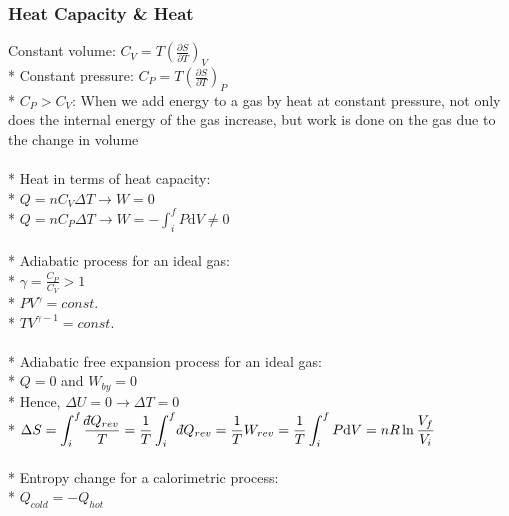 \subsubsection{Heat Capacity \& Heat}
Constant volume: \(\displaystyle C_V=T\left(\frac{\partial S}{\partial T}\right)_V\)\\*
Constant pressure: \(\displaystyle C_P=T\left(\frac{\partial S}{\partial T}\right)_P\)\\*
\(C_P>C_V\): When we add energy to a gas by heat at constant pressure, not only does the internal energy of the gas increase, but work is done on the gas due to the change in volume\\\\*
%
Heat in terms of heat capacity:\\*
\(Q=nC_V\Delta T \rightarrow W=0\)\\*
\(Q=nC_P\Delta T \rightarrow W=-\int_i^f{P\mathrm{d}V}\neq0\)\\\\*
%
Adiabatic process for an ideal gas:\\*
\(\displaystyle\gamma=\frac{C_P}{C_V}>1\)\\*
\(PV^{\gamma}=const.\)\\*
\(TV^{\gamma-1}=const.\)\\\\*
%
Adiabatic free expansion process for an ideal gas:\\*
\(Q=0\) and \(W_{by}=0\)\\*
Hence, \(\Delta U=0 \rightarrow\Delta T=0\)\\*
\(\displaystyle\Delta S=\int_{i}^{f}\frac{\dbar Q_{rev}}{T}=\frac{1}{T}\int_{i}^{f}\dbar Q_{rev}=\frac{1}{T}W_{rev}=\frac{1}{T}\int_{i}^{f}P\mathrm{d}V=nR\ln{\frac{V_f}{V_i}}\)\\\\*
Entropy change for a calorimetric process:\\*
\(Q_{cold}=-Q_{hot}\)

